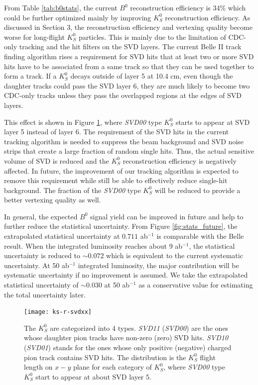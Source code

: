 From Table \ref{tab:b0stats}, the current $B^0$ reconstruction efficiency is 34\% which could be further optimized mainly by improving $K_S^0$ reconstruction efficiency. As discussed in Section 3, the reconstruction efficiency and vertexing quality become worse for long-flight $K_S^0$ particles. This is mainly due to the limitation of CDC-only tracking and the hit filters on the SVD layers. The current Belle II track finding algorithm rises a requirement for SVD hits that at least two or more SVD hits have to be associated from a same track so that they can be used together to form a track. If a $K_S^0$ decays outside of layer 5 at 10.4 cm, even though the daughter tracks could pass the SVD layer 6, they are much likely to become two CDC-only tracks unless they pass the overlapped regions at the edges of SVD layers. 

This effect is shown in Figure \ref{fig:svd-r-xx}, where \textit{SVD00} type $K_S^0$ starts to appear at SVD layer 5 instead of layer 6. The requirement of the SVD hits in the current tracking algorithm is needed to suppress the beam background and SVD noise strips that create a large fraction of random single hits. Thus, the actual sensitive volume of SVD is reduced and the $K_S^0$ reconstruction efficiency is negatively affected. 
In future, the improvement of our tracking algorithm is expected to remove this requirement while still be able to effectively reduce single-hit background. The fraction of the \textit{SVD00} type $K_S^0$ will be reduced to provide a better vertexing quality as well.

In general, the expected $B^0$ signal yield can be improved in future and help to further reduce the statistical uncertainty. From Figure \ref{fig:stats_future}, the extrapolated statistical uncertainty at $0.711$ ab$^{-1}$ is comparable with the Belle result. 
When the integrated luminosity reaches about 9 ab$^{-1}$, the statistical uncertainty is reduced to $\sim 0.072$ which is equivalent to the current systematic uncertainty. At 50 ab$^{-1}$ integrated luminosity, the major contribution will be systematic uncertainty if no improvement is assumed. We take the extrapolated statistical uncertainty of $\sim 0.030$ at 50 ab$^{-1}$ as a conservative value for estimating the total uncertainty later.



\begin{figure}[htpb]
	\centering
	\texttt{[image: ks-r-svdxx]}
	\caption{The $K_S^0$ are categorized into 4 types. \textit{SVD11} (\textit{SVD00}) are the ones whose daughter pion tracks have non-zero (zero) SVD hits. \textit{SVD10} (\textit{SVD01}) stands for the ones whose only positive (negative) charged pion track contains SVD hits.
		 The distribution is the $K_S^0$ flight length on $x-y$ plane for each category of $K_S^0$, where \textit{SVD00} type $K_S^0$ start to appear at about SVD layer 5.}
	\label{fig:svd-r-xx}
\end{figure}


